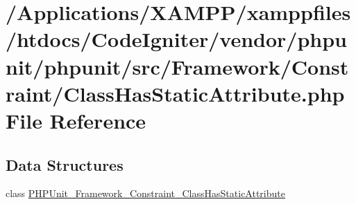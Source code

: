 \hypertarget{_class_has_static_attribute_8php}{}\section{/\+Applications/\+X\+A\+M\+P\+P/xamppfiles/htdocs/\+Code\+Igniter/vendor/phpunit/phpunit/src/\+Framework/\+Constraint/\+Class\+Has\+Static\+Attribute.php File Reference}
\label{_class_has_static_attribute_8php}
\subsection*{Data Structures}
\begin{DoxyCompactItemize}
\item 
class \mbox{\hyperlink{class_p_h_p_unit___framework___constraint___class_has_static_attribute}{P\+H\+P\+Unit\+\_\+\+Framework\+\_\+\+Constraint\+\_\+\+Class\+Has\+Static\+Attribute}}
\end{DoxyCompactItemize}

